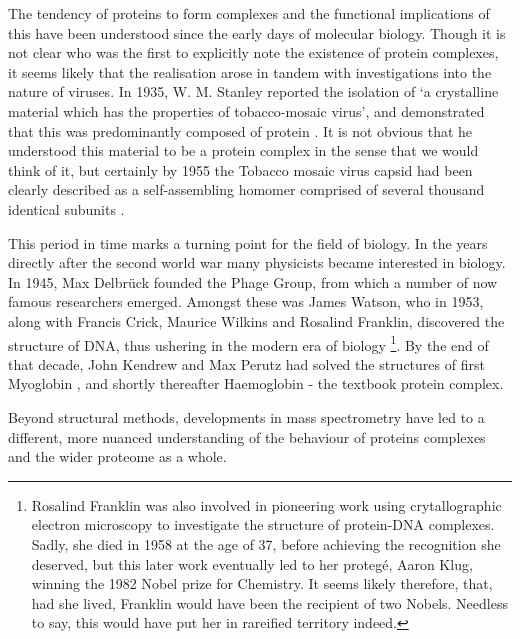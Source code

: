\documentclass[a4paper,11pt,twoside,openright]{scrbook}
\let\cite\supercite
\begin{document}

The tendency of proteins to form complexes and the functional implications of this have been understood since the early days of molecular biology. Though it is not clear who was the first to explicitly note the existence of protein complexes, it seems likely that the realisation arose in tandem with investigations into the nature of viruses. In 1935, W. M. Stanley reported the isolation of `a crystalline material which has the properties of tobacco-mosaic virus', and demonstrated that this was predominantly composed of protein \cite{Stanley1935}. It is not obvious that he understood this material to be a protein complex in the sense that we would think of it, but certainly by 1955 the Tobacco mosaic virus capsid had been clearly described as a self-assembling homomer comprised of several thousand identical subunits \cite{Fraenkel-Conrat1955}.

This period in time marks a turning point for the field of biology. In the years directly after the second world war many physicists became interested in biology. In 1945, Max Delbr{\"u}ck founded the Phage Group, from which a number of now famous researchers emerged. Amongst these was James Watson, who in 1953, along with Francis Crick, Maurice Wilkins and Rosalind Franklin, discovered the structure of DNA, thus ushering in the modern era of biology \footnote{ Rosalind Franklin was also involved in pioneering work using crytallographic electron microscopy to investigate the structure of protein-DNA complexes. Sadly, she died in 1958 at the age of 37, before achieving the recognition she deserved, but this later work eventually led to her proteg{\'e},  Aaron Klug, winning the 1982 Nobel prize for Chemistry. It seems likely therefore, that, had she lived, Franklin would have been the recipient of two Nobels. Needless to say, this would have put her in rareified territory indeed.}.
By the end of that decade, John Kendrew and Max Perutz had solved the structures of first Myoglobin \cite{Kendrew1958}, and shortly thereafter Haemoglobin \cite{Perutz1960} - the textbook protein complex.


Beyond structural methods, developments in mass spectrometry have led to a different, more nuanced understanding of the behaviour of proteins complexes and the wider proteome as a whole.
\end{document}
